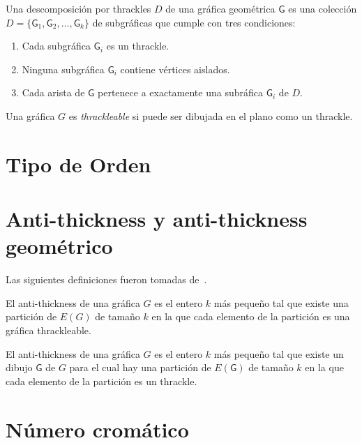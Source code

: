 Una descomposición por thrackles $D$ de una gráfica geométrica
$\mathsf{G}$ es una colección $D=\{\mathsf{G}_1,\mathsf{G}_2,\dots,\mathsf{G}_k\}$
de subgráficas que cumple con tres condiciones:
\begin{enumerate}
  \item Cada subgráfica $\mathsf{G}_i$ es un thrackle.
  \item Ninguna subgráfica $\mathsf{G}_i$ contiene vértices aislados.
  \item Cada arista de $\mathsf{G}$ pertenece a exactamente una subráfica $\mathsf{G}_i$ de $D$.
\end{enumerate}

Una gráfica $G$ es \emph{thrackleable} si puede ser dibujada en el plano como un thrackle.
\section{Tipo de Orden}
\section{Anti-thickness y anti-thickness geométrico}
Las siguientes definiciones fueron tomadas de~\cite{Dujmovic2017}.

El anti-thickness de una gráfica $G$ es el entero $k$ más pequeño tal que existe una
partición de $E(G)$ de tamaño $k$ en la que cada elemento de la partición
es una gráfica thrackleable.

El anti-thickness de una gráfica $G$ es el entero $k$ más pequeño tal que existe un
dibujo $\mathsf{G}$ de $G$ para el cual hay una partición de $E(\mathsf{G})$ de tamaño $k$
en la que cada elemento de la partición es un thrackle.
\section{Número cromático}
